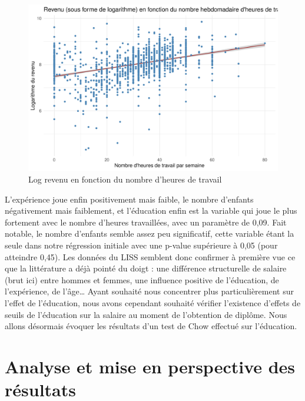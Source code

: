 \documentclass[a4paper, french, 11 pt]{article}\usepackage[]{graphicx}\usepackage[]{xcolor}
\makeatletter
\newenvironment{kframe}{%
 \def\at@end@of@kframe{}%
 \ifinner\ifhmode%
  \def\at@end@of@kframe{\end{minipage}}%
  \begin{minipage}{\columnwidth}%
 \fi\fi%
 \def\FrameCommand##1{\hskip\@totalleftmargin \hskip-\fboxsep
 \colorbox{shadecolor}{##1}\hskip-\fboxsep
     \hskip-\linewidth \hskip-\@totalleftmargin \hskip\columnwidth}%
 \MakeFramed {\advance\hsize-\width
   \@totalleftmargin\z@ \linewidth\hsize
   \@setminipage}}%
 {\par\unskip\endMakeFramed%
 \at@end@of@kframe}
\newenvironment{knitrout}{}{} %
\makeatother
\begin{document}
\begin{knitrout}
\color{fgcolor}\begin{kframe}


{\ttfamily\noindent\itshape{}}\end{kframe}
\end{knitrout}

\begin{figure}[h]
\center
\includegraphics[width=0.7\linewidth]{figure/heures_logrevenu.pdf}
\caption{Log revenu en fonction du nombre d'heures de travail\label{fig:heureslogrevenu}}
\end{figure}

L’expérience joue enfin positivement mais faible, le nombre d’enfants négativement mais faiblement, et l’éducation enfin est la variable qui joue le plus fortement avec le nombre d’heures travaillées, avec un paramètre de 0,09. Fait notable, le nombre d’enfants semble assez peu significatif, cette variable étant la seule dans notre régression initiale avec une p-value supérieure à 0,05 (pour atteindre 0,45).
        Les données du LISS semblent donc confirmer à première vue ce que la littérature a déjà pointé du doigt : une différence structurelle de salaire (brut ici) entre hommes et femmes, une influence positive de l’éducation, de l’expérience, de l’âge… Ayant souhaité nous concentrer plus particulièrement sur l’effet de l’éducation, nous avons cependant souhaité vérifier l’existence d'effets de seuils de l’éducation sur la salaire au moment de l’obtention de diplôme. Nous allons désormais évoquer les résultats d’un test de Chow effectué sur l’éducation. 

\section{Analyse et mise en perspective des résultats}
\end{document}

